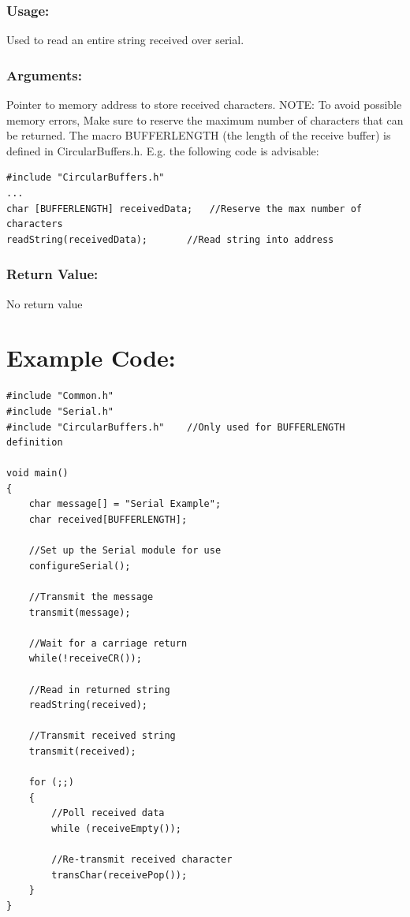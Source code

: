 \documentclass[]{report}
\begin{document}
\subsubsection{Usage:}
Used to read an entire string received over serial.

\subsubsection{Arguments:}
Pointer to memory address to store received characters. \newline
NOTE: To avoid possible memory errors, Make sure to reserve the maximum number of characters that can be returned. The macro BUFFERLENGTH (the length of the receive buffer) is defined in CircularBuffers.h. E.g. the following code is advisable:
\begin{lstlisting}
#include "CircularBuffers.h"
...
char [BUFFERLENGTH] receivedData; 	//Reserve the max number of characters
readString(receivedData);		//Read string into address
\end{lstlisting}

\subsubsection{Return Value:}
No return value


\section{Example Code:}
\begin{lstlisting}
#include "Common.h"
#include "Serial.h"
#include "CircularBuffers.h"	//Only used for BUFFERLENGTH definition

void main()
{
	char message[] = "Serial Example";
	char received[BUFFERLENGTH];

	//Set up the Serial module for use
	configureSerial();
	
	//Transmit the message
	transmit(message);
	
	//Wait for a carriage return
	while(!receiveCR());
		
	//Read in returned string
	readString(received);
		
	//Transmit received string
	transmit(received);
	
	for (;;)
	{
		//Poll received data
		while (receiveEmpty());
		
		//Re-transmit received character
		transChar(receivePop());
	}
}
\end{lstlisting}
\end{document}
